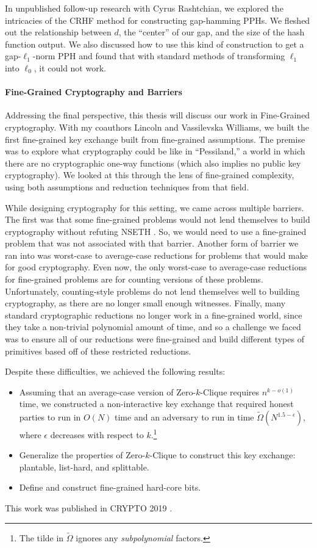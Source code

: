 In unpublished follow-up research with Cyrus Rashtchian, we explored the intricacies of the CRHF method for constructing gap-hamming PPHs. We fleshed out the relationship between $d$, the ``center'' of our gap, and the size of the hash function output. We also discussed how to use this kind of construction to get a gap-$\ell_1$-norm PPH and found that with standard methods of transforming $\ell_1$ into $\ell_0$, it could not work. %

\paragraph{Fine-Grained Cryptography and Barriers}
Addressing the final perspective, this thesis will discuss our work in Fine-Grained cryptography. With my coauthors Lincoln and Vassilevska Williams, we built the first fine-grained key exchange built from fine-grained assumptions. The premise was to explore what cryptography could be like in ``Pessiland,'' a world in which there are no cryptographic one-way functions (which also implies no public key cryptography). We looked at this through the lens of fine-grained complexity, using both assumptions and reduction techniques from that field.

While designing cryptography for this setting, we came across multiple barriers. The first was that some fine-grained problems would not lend themselves to build cryptography without refuting NSETH \cite{CarmosinoGIMPS16}. So, we would need to use a fine-grained problem that was not associated with that barrier. Another form of barrier we ran into was worst-case to average-case reductions for problems that would make for good cryptography. Even now, the only worst-case to average-case reductions for fine-grained problems are for counting versions of these problems. Unfortunately, counting-style problems do not lend themselves well to building cryptography, as there are no longer small enough witnesses. Finally, many standard cryptographic reductions no longer work in a fine-grained world, since they take a non-trivial polynomial amount of time, and so a challenge we faced was to ensure all of our reductions were fine-grained and build different types of primitives based off of these restricted reductions.

Despite these difficulties, we achieved the following results:
\begin{itemize}
	\item Assuming that an average-case version of Zero-$k$-Clique requires $n^{k - o(1)}$ time, we constructed a non-interactive key exchange that required honest parties to run in $O(N)$ time and an adversary to run in time $\tilde\Omega(N^{1.5 - \epsilon})$, where $\epsilon$ decreases with respect to $k$.\footnote{The tilde in $\tilde \Omega$ ignores any \emph{subpolynomial} factors.}
	\item Generalize the properties of Zero-$k$-Clique to construct this key exchange: plantable, list-hard, and splittable.
	\item Define and construct fine-grained hard-core bits.
\end{itemize}
This work was published in CRYPTO 2019 \cite{LLVW19}.

